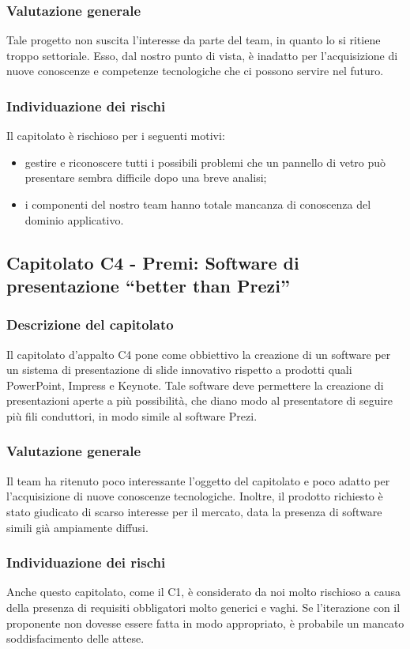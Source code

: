 		\subsubsection{Valutazione generale}
			Tale progetto non suscita l'interesse da parte del team, in quanto lo si ritiene troppo settoriale. Esso, dal nostro punto di vista, è inadatto per l'acquisizione di nuove conoscenze e competenze tecnologiche che ci possono servire nel futuro.
		\subsubsection{Individuazione dei rischi}
			Il capitolato è rischioso per i seguenti motivi:
			\begin{itemize}
				\item gestire e riconoscere tutti i possibili problemi che un pannello di vetro può presentare sembra difficile dopo una breve analisi;
				\item i componenti del nostro team hanno totale mancanza di conoscenza del dominio applicativo.
			\end{itemize}
	\subsection{Capitolato C4 - Premi: Software di presentazione “better than Prezi”}
		\subsubsection{Descrizione del capitolato}
			Il capitolato d'appalto C4 pone come obbiettivo la creazione di un software per un sistema di presentazione di slide innovativo rispetto a prodotti quali PowerPoint, Impress e Keynote. Tale software deve permettere la creazione di presentazioni aperte a più possibilità, che diano modo al presentatore di seguire più fili conduttori, in modo simile al software Prezi.
		\subsubsection{Valutazione generale}
			Il team ha ritenuto poco interessante l'oggetto del capitolato e poco adatto per l'acquisizione di nuove conoscenze tecnologiche. Inoltre, il prodotto richiesto è stato giudicato di scarso interesse per il mercato, data la presenza di software simili già ampiamente diffusi.
		\subsubsection{Individuazione dei rischi}
			Anche questo capitolato, come il C1, è considerato da noi molto rischioso a causa della presenza di requisiti obbligatori molto generici e vaghi. Se l'iterazione con il proponente non dovesse essere fatta in modo appropriato, è probabile un mancato soddisfacimento delle attese.
